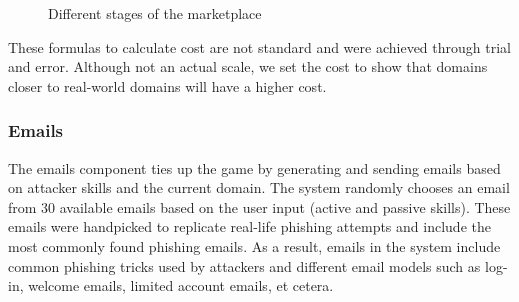 \begin{figure}[!ht]
    \centering
    \hfill
    \hfill
    \label{fig:marketplace-state}
    \caption{Different stages of the marketplace}
\end{figure}

These formulas to calculate cost are not standard and were achieved through trial and error. Although not an actual scale, we set the cost to show that domains closer to real-world domains will have a higher cost.

\subsubsection{Emails}
The emails component ties up the game by generating and sending emails based on attacker skills and the current domain. The system randomly chooses an email from 30 available emails based on the user input (active and passive skills). These emails were handpicked to replicate real-life phishing attempts and include the most commonly found phishing emails. As a result, emails in the system include common phishing tricks used by attackers and different email models such as log-in, welcome emails, limited account emails, et cetera.

